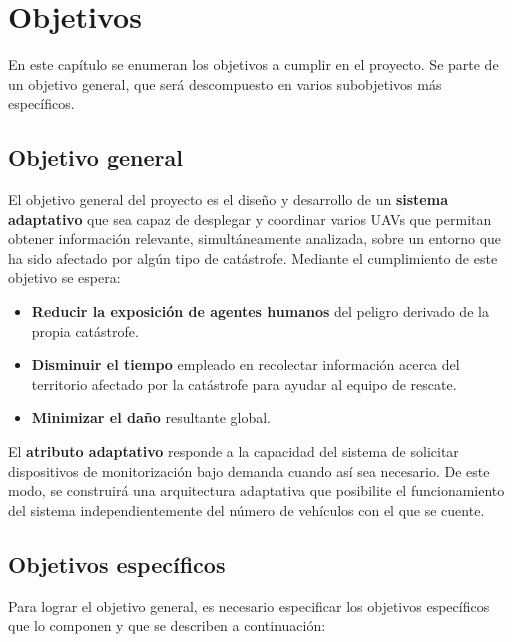 \chapter{Objetivos}
\label{chap:objetivos}

En este capítulo se enumeran los objetivos a cumplir en el proyecto. Se parte de un objetivo general, que será descompuesto en varios subobjetivos más específicos.

\section{Objetivo general}
\label{sec:objetivogeneral}

El objetivo general del proyecto es el diseño y desarrollo de un \textbf{sistema adaptativo} que sea capaz de desplegar y coordinar varios \acs{UAV}s que permitan obtener información relevante, simultáneamente analizada, sobre un entorno que ha sido afectado por algún tipo de catástrofe. Mediante el cumplimiento de este objetivo se espera:

\begin{itemize}
\item \textbf{Reducir la exposición de agentes humanos} del peligro derivado de la propia catástrofe.
\item \textbf{Disminuir el tiempo} empleado en recolectar información acerca del territorio afectado por la catástrofe para ayudar al equipo de rescate.
\item \textbf{Minimizar el daño} resultante global.
\end{itemize}

El \textbf{atributo adaptativo} responde a la capacidad del sistema de solicitar dispositivos de monitorización bajo demanda cuando así sea necesario. De este modo, se construirá una arquitectura adaptativa que posibilite el funcionamiento del sistema independientemente del número de vehículos con el que se cuente.

\section{Objetivos específicos}
\label{sec:objetivoespecifico}
Para lograr el objetivo general, es necesario especificar los objetivos específicos que lo componen y que se describen a continuación:

